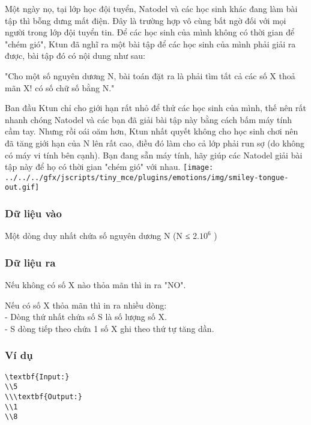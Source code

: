 



   Một ngày nọ, tại lớp học đội tuyển, Natodel và các học sinh khác đang làm bài tập thì bỗng dưng mất điện. Đây là trường hợp vô cùng bất ngờ đối với mọi người trong lớp đội tuyển tin. Để các học sinh của mình không có thời gian để "chém gió", Ktun đã nghĩ ra một bài tập để các học sinh của mình phải giải ra được, bài tập đó có nội dung như sau:  

   "Cho một số nguyên dương N, bài toán đặt ra là phải tìm tất cả các số X thoả mãn X! có số chữ số bằng N."  

   Ban đầu Ktun chỉ cho giới hạn rất nhỏ để thử các học sinh của mình, thế nên rất nhanh chóng Natodel và các bạn đã giải bài tập này bằng cách bấm máy tính cầm tay. Nhưng rồi oái oăm hơn, Ktun nhất quyết không cho học sinh chơi nên đã tăng giới hạn của N lên rất cao, điều đó làm cho cả lớp phải run sợ (do không có máy vi tính bên cạnh). Bạn đang sẵn máy tính, hãy giúp các Natodel giải bài tập này để họ có thời gian "chém gió" với nhau.   
\texttt{[image: ../../../gfx/jscripts/tiny\_mce/plugins/emotions/img/smiley-tongue-out.gif]}

\subsubsection{   Dữ liệu vào  }

   Một dòng duy nhất chứa số nguyên dương N (N ≤ 2.$10^{6}$   )  

\subsubsection{   Dữ liệu ra  }

   Nếu không có số X nào thỏa mãn thì in ra "NO".  

   Nếu có số X thỏa mãn thì in ra nhiều dòng:   
\\   - Dòng thứ nhất chứa số S là số lượng số X.   
\\   - S dòng tiếp theo chứa 1 số X ghi theo thứ tự tăng dần.  

\subsubsection{   Ví dụ  }
\begin{verbatim}
\textbf{Input:}
\\5
\\\textbf{Output:}
\\1
\\8\end{verbatim}

